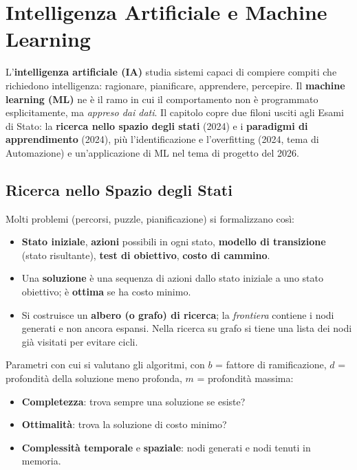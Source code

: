 \chapter{Intelligenza Artificiale e Machine Learning}

L'\textbf{intelligenza artificiale (IA)} studia sistemi capaci di compiere compiti che richiedono intelligenza: ragionare, pianificare, apprendere, percepire. Il \textbf{machine learning (ML)} ne è il ramo in cui il comportamento non è programmato esplicitamente, ma \emph{appreso dai dati}. Il capitolo copre due filoni usciti agli Esami di Stato: la \textbf{ricerca nello spazio degli stati} (2024) e i \textbf{paradigmi di apprendimento} (2024), più l'identificazione e l'overfitting (2024, tema di Automazione) e un'applicazione di ML nel tema di progetto del 2026.

\section{Ricerca nello Spazio degli Stati}
Molti problemi (percorsi, puzzle, pianificazione) si formalizzano così:
\begin{itemize}
    \item \textbf{Stato iniziale}, \textbf{azioni} possibili in ogni stato, \textbf{modello di transizione} (stato risultante), \textbf{test di obiettivo}, \textbf{costo di cammino}.
    \item Una \textbf{soluzione} è una sequenza di azioni dallo stato iniziale a uno stato obiettivo; è \textbf{ottima} se ha costo minimo.
    \item Si costruisce un \textbf{albero (o grafo) di ricerca}; la \emph{frontiera} contiene i nodi generati e non ancora espansi. Nella ricerca su grafo si tiene una lista dei nodi già visitati per evitare cicli.
\end{itemize}

Parametri con cui si valutano gli algoritmi, con $b$ = fattore di ramificazione, $d$ = profondità della soluzione meno profonda, $m$ = profondità massima:
\begin{itemize}
    \item \textbf{Completezza}: trova sempre una soluzione se esiste?
    \item \textbf{Ottimalità}: trova la soluzione di costo minimo?
    \item \textbf{Complessità temporale} e \textbf{spaziale}: nodi generati e nodi tenuti in memoria.
\end{itemize}

